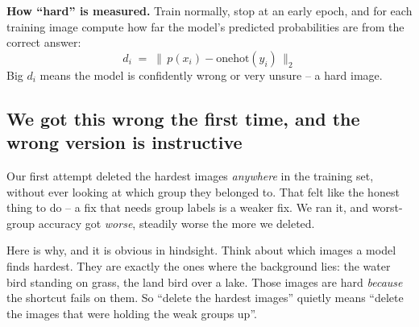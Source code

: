 \documentclass[11pt]{article}
\begin{document}
\textbf{How ``hard'' is measured.} Train normally, stop at an early epoch, and
for each training image compute how far the model's predicted probabilities are
from the correct answer:
\[
  d_i \;=\; \bigl\lVert\, p(x_i) - \text{onehot}(y_i) \,\bigr\rVert_2
\]
Big $d_i$ means the model is confidently wrong or very unsure -- a hard image.

\begin{center}
\end{center}

\subsection{We got this wrong the first time, and the wrong version is
instructive}

Our first attempt deleted the hardest images \emph{anywhere} in the training
set, without ever looking at which group they belonged to. That felt like the
honest thing to do -- a fix that needs group labels is a weaker fix. We ran it,
and worst-group accuracy got \emph{worse}, steadily worse the more we deleted.

Here is why, and it is obvious in hindsight. Think about which images a model
finds hardest. They are exactly the ones where the background lies: the water
bird standing on grass, the land bird over a lake. Those images are hard
\emph{because} the shortcut fails on them. So ``delete the hardest images''
quietly means ``delete the images that were holding the weak groups up''.
\end{document}

